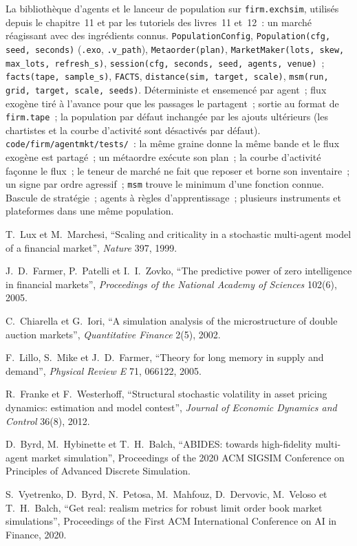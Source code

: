 \begin{build}
 La bibliothèque d'agents et le lanceur de population sur \texttt{firm.exchsim}, utilisés depuis le chapitre~11 et par les tutoriels des livres~11 et~12~: un
marché réagissant avec des ingrédients connus.
 \texttt{PopulationConfig}, \texttt{Population(cfg, seed, seconds)} (\texttt{.exo}, \texttt{.v\_path}), \texttt{Metaorder(plan)},
\texttt{MarketMaker(lots, skew, max\_lots, refresh\_s)}, \texttt{session(cfg, seconds, seed, agents, venue)}~; \texttt{facts(tape, sample\_s)},
\texttt{FACTS}, \texttt{distance(sim, target, scale)}, \texttt{msm(run, grid, target, scale, seeds)}.
 Déterministe et ensemencé par agent~; flux exogène tiré à l'avance pour que les passages le partagent~; sortie au format de \texttt{firm.tape}~; la
population par défaut inchangée par les ajouts ultérieurs (les chartistes et la courbe d'activité sont désactivés par défaut).
 \texttt{code/firm/agentmkt/tests/}~: la même graine donne la même bande et le flux exogène est partagé~; un métaordre exécute son
plan~; la courbe d'activité façonne le flux~; le teneur de marché ne fait que reposer et borne son inventaire~; un signe par ordre agressif~; \texttt{msm} trouve le
minimum d'une fonction connue.
 Bascule de stratégie~; agents à règles d'apprentissage~; plusieurs instruments et plateformes dans une même population.
\end{build}

\begin{omsources}
\item T.~Lux et M.~Marchesi, ``Scaling and criticality in a stochastic multi-agent model of a financial market'', \emph{Nature} 397, 1999.
\item J.~D.~Farmer, P.~Patelli et I.~I.~Zovko, ``The predictive power of zero intelligence in financial markets'', \emph{Proceedings of the National
Academy of Sciences} 102(6), 2005.
\item C.~Chiarella et G.~Iori, ``A simulation analysis of the microstructure of double auction markets'', \emph{Quantitative Finance} 2(5), 2002.
\item F.~Lillo, S.~Mike et J.~D.~Farmer, ``Theory for long memory in supply and demand'', \emph{Physical Review E} 71, 066122, 2005.
\item R.~Franke et F.~Westerhoff, ``Structural stochastic volatility in asset pricing dynamics: estimation and model contest'', \emph{Journal of
Economic Dynamics and Control} 36(8), 2012.
\item D.~Byrd, M.~Hybinette et T.~H.~Balch, ``ABIDES: towards high-fidelity multi-agent market simulation'', Proceedings of the 2020 ACM SIGSIM
Conference on Principles of Advanced Discrete Simulation.
\item S.~Vyetrenko, D.~Byrd, N.~Petosa, M.~Mahfouz, D.~Dervovic, M.~Veloso et T.~H.~Balch, ``Get real: realism metrics for robust limit order book
market simulations'', Proceedings of the First ACM International Conference on AI in Finance, 2020.
\end{omsources}

